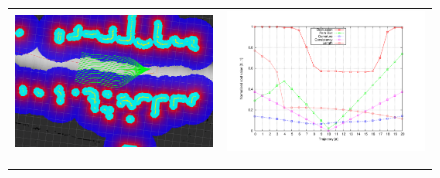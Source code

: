 \begin{figure}[h!]
    \centering
    \begin{tabular}{cc}
    \begin{minipage}{.45\textwidth}
      \centering
      \includegraphics[width=\textwidth]{example4}
    \end{minipage} &
    \begin{minipage}{.45\textwidth}
      \centering
      \includegraphics[width=\textwidth,trim=50 40 80 60,clip]{costs4}\label{fig:cp07_example3}
    \end{minipage}\\ \\
    \begin{minipage}{.45\textwidth}
      \centering

\end{minipage}
\end{tabular}
\end{figure}
